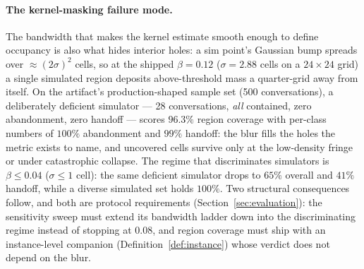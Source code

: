 \paragraph{The kernel-masking failure mode.}
The bandwidth that makes the kernel estimate smooth enough to define occupancy is also what
hides interior holes: a sim point's Gaussian bump spreads over $\approx (2\sigma)^2$ cells,
so at the shipped $\beta = 0.12$ ($\sigma = 2.88$ cells on a $24 \times 24$ grid) a single
simulated region deposits above-threshold mass a quarter-grid away from itself.
On the artifact's production-shaped sample set (500 conversations), a deliberately deficient
simulator --- 28 conversations, \emph{all} contained, zero abandonment, zero handoff ---
scores $96.3\%$ region coverage with per-class numbers of $100\%$ abandonment and $99\%$
handoff: the blur fills the holes the metric exists to name, and uncovered cells survive
only at the low-density fringe or under catastrophic collapse.
The regime that discriminates simulators is $\beta \le 0.04$ ($\sigma \le 1$ cell): the same
deficient simulator drops to $65\%$ overall and $41\%$ handoff, while a diverse simulated
set holds $100\%$.
Two structural consequences follow, and both are protocol requirements
(Section~\ref{sec:evaluation}): the sensitivity sweep must extend its bandwidth ladder down
into the discriminating regime instead of stopping at $0.08$, and region coverage must ship
with an instance-level companion (Definition~\ref{def:instance}) whose verdict does not
depend on the blur.

